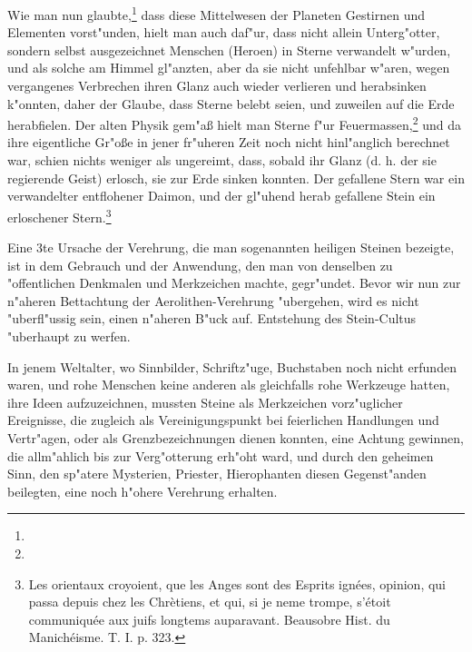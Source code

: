 \documentclass[a4paper, 11pt, oneside, polutonikogreek, german]{article}
\begin{document}
Wie man nun glaubte,\footnote{} dass diese Mittelwesen der Planeten Gestirnen und Elementen vorst"unden, hielt man auch daf"ur, dass nicht allein Unterg"otter, sondern selbst ausgezeichnet Menschen (Heroen) in Sterne verwandelt w"urden, und als solche am Himmel gl"anzten, aber da sie nicht unfehlbar w"aren, wegen vergangenes Verbrechen ihren Glanz auch wieder verlieren und herabsinken k"onnten, daher der Glaube, dass Sterne belebt seien, und zuweilen auf die Erde herabfielen. Der alten Physik gem"aß hielt man Sterne f"ur Feuermassen,\footnote{} und da ihre eigentliche Gr"oße in jener fr"uheren Zeit noch nicht hinl"anglich berechnet war, schien nichts weniger als ungereimt, dass, sobald ihr Glanz (d. h. der sie regierende Geist) erlosch, sie zur Erde sinken konnten. Der gefallene Stern war ein verwandelter entflohener Daimon, und der gl"uhend herab gefallene Stein ein erloschener Stern.\footnote{Les orientaux croyoient, que les Anges sont des Esprits ignées, opinion, qui passa depuis chez les Chrètiens, et qui, si je neme trompe, s'étoit communiquée aux juifs longtems auparavant. Beausobre Hist. du Manichéisme. T. I. p. 323.}

Eine 3te Ursache der Verehrung, die man sogenannten heiligen Steinen bezeigte, ist in dem Gebrauch und der Anwendung, den man von denselben zu "offentlichen Denkmalen und Merkzeichen machte, gegr"undet. Bevor wir nun zur n"aheren Bettachtung der Aerolithen-Verehrung "ubergehen, wird es nicht "uberfl"ussig sein, einen n"aheren B"uck auf. Entstehung des Stein-Cultus "uberhaupt zu werfen.

In jenem Weltalter, wo Sinnbilder, Schriftz"uge, Buchstaben noch nicht erfunden waren, und rohe Menschen keine anderen als gleichfalls rohe Werkzeuge hatten, ihre Ideen aufzuzeichnen, mussten Steine als Merkzeichen vorz"uglicher Ereignisse, die zugleich als Vereinigungspunkt bei feierlichen Handlungen und Vertr"agen, oder als Grenzbezeichnungen dienen konnten, eine Achtung gewinnen, die allm"ahlich bis zur Verg"otterung erh"oht ward, und durch den geheimen Sinn, den sp"atere Mysterien, Priester, Hierophanten diesen Gegenst"anden beilegten, eine noch h"ohere Verehrung erhalten.
\end{document}
